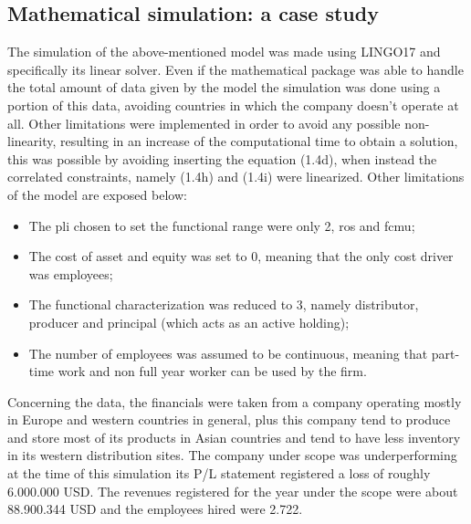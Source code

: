 \begin{doublespace}
\section{Mathematical simulation: a case study}
The simulation of the above-mentioned model was made using LINGO17 and specifically its linear solver. Even if the mathematical package was able to handle the total amount of data given by the model the simulation was done using a portion of this data, avoiding countries in which the company doesn't operate at all. Other limitations were implemented in order to avoid any possible non-linearity, resulting in an increase of the computational time to obtain a solution, this was possible by avoiding inserting the equation (1.4d), when instead the correlated constraints, namely (1.4h) and (1.4i) were linearized. Other limitations of the model are exposed below:
\begin{itemize}
	\item The \gls{pli} chosen to set the functional range were only 2, \gls{ros} and \gls{fcmu};
    \item The cost of asset and equity was set to 0, meaning that the only cost driver was employees;
    \item The functional characterization was reduced to 3, namely distributor, producer and principal (which acts as an active holding);
    \item The number of employees was assumed to be continuous, meaning that part-time work and non full year worker can be used by the firm.
\end{itemize}

Concerning the data, the financials were taken from a company operating mostly in Europe and western countries in general, plus this company tend to produce and store most of its products in Asian countries and tend to have less inventory in its western distribution sites. The company under scope was underperforming at the time of this simulation its P/L statement registered a loss of roughly  6.000.000 USD. The revenues registered for the year under the scope were about 88.900.344 USD and the employees hired were 2.722.


\end{doublespace}
